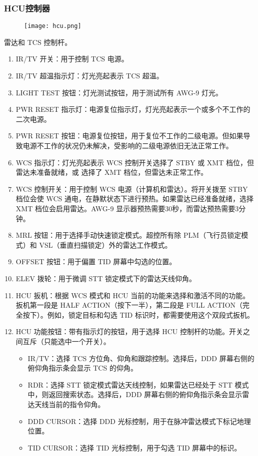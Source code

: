 \subsubsection{HCU控制器}
\begin{figure}[htb]
	\centering
	\texttt{[image: hcu.png]}
\end{figure}
雷达和 TCS 控制杆。

\begin{enumerate}
	\item IR/TV 开关：用于控制 TCS 电源。
	\item IR/TV 超温指示灯：灯光亮起表示 TCS 超温。
	\item LIGHT TEST 按钮：灯光测试按钮，用于测试所有 AWG-9 灯光。
	\item PWR RESET 指示灯：电源复位指示灯，灯光亮起表示一个或多个不工作的二次电源。
	\item PWR RESET 按钮：电源复位按钮，用于复位不工作的二级电源。但如果导致电源不工作的状况仍未解决，受影响的二级电源依旧无法正常工作。
	\item WCS 指示灯：灯光亮起表示 WCS 控制开关选择了 STBY 或 XMT 档位，但雷达未准备就绪，或 选择了 XMT 档位，但雷达未正常工作。
	\item WCS 控制开关：用于控制 WCS 电源（计算机和雷达）。将开关拨至 STBY 档位会使 WCS 通电，在静默状态下进行预热。如果雷达已经准备就绪，选择 XMT 档位会启用雷达。AWG-9 显示器预热需要30秒，而雷达预热需要3分钟。
	\item MRL 按钮：用于选择手动快速锁定模式。超控所有除 PLM（飞行员锁定模式）和 VSL（垂直扫描锁定）外的雷达工作模式。
	\item OFFSET 按钮：用于偏置 TID 屏幕中勾选的位置。
	\item ELEV 拨轮：用于微调 STT 锁定模式下的雷达天线仰角。
	\item HCU 扳机：根据 WCS 模式和 HCU 当前的功能来选择和激活不同的功能。扳机第一段是 HALF ACTION（按下一半），第二段是 FULL ACTION（完全按下）。例如，锁定目标和勾选 TID 标识时，都需要使用这个双段式扳机。
	\item HCU 功能按钮：带有指示灯的按钮，用于选择 HCU 控制杆的功能。开关之间互斥（只能选中一个开关）。
	      \begin{itemize}
		      \item IR/TV：选择 TCS 方位角、仰角和跟踪控制。选择后，DDD 屏幕右侧的俯仰角指示条会显示 TCS 的仰角。
		      \item RDR：选择 STT 锁定模式雷达天线控制，如果雷达已经处于 STT 模式中，则返回搜索状态。选择后，DDD 屏幕右侧的俯仰角指示条会显示雷达天线当前的指令仰角。
		      \item DDD CURSOR：选择 DDD 光标控制，用于在脉冲雷达模式下标记地理位置。
		      \item TID CURSOR：选择 TID 光标控制，用于勾选 TID 屏幕中的标识。
	      \end{itemize}
\end{enumerate}

